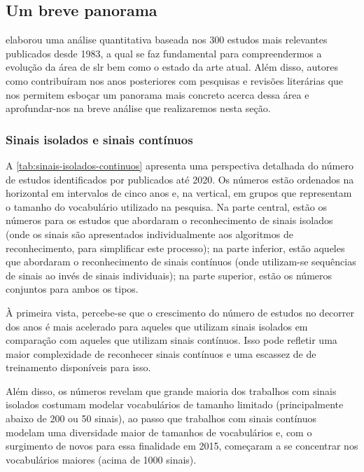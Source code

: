 \subsection{Um breve panorama}
\label{sec:slr-breve-panorama}

 elaborou uma análise quantitativa baseada nos 300 estudos mais relevantes publicados desde 1983, a qual se faz fundamental para compreendermos a evolução da área de \acrshort{slr} bem como o estado da arte atual. Além disso, autores como  contribuíram nos anos posteriores com pesquisas e revisões literárias que nos permitem esboçar um panorama mais concreto acerca dessa área e aprofundar-nos na breve análise que realizaremos nesta seção.



\subsubsection{Sinais isolados e sinais contínuos}
\label{sec:slr-sinais-isolados-continuos}

A \autoref{tab:sinais-isolados-continuos} apresenta uma perspectiva detalhada do número de estudos identificados por  publicados até 2020. Os números estão ordenados na horizontal em intervalos de cinco anos e, na vertical, em grupos que representam o tamanho do vocabulário utilizado na pesquisa. Na parte central, estão os números para os estudos que abordaram o reconhecimento de sinais isolados (onde os sinais são apresentados individualmente aos algoritmos de reconhecimento, para simplificar este processo); na parte inferior, estão aqueles que abordaram o reconhecimento de sinais contínuos (onde utilizam-se sequências de sinais ao invés de sinais individuais); na parte superior, estão os números conjuntos para ambos os tipos.



À primeira vista, percebe-se que o crescimento do número de estudos no decorrer dos anos é mais acelerado para aqueles que utilizam sinais isolados em comparação com aqueles que utilizam sinais contínuos. Isso pode refletir uma maior complexidade de reconhecer sinais contínuos e uma escassez de \datasets de treinamento disponíveis para isso. 

Além disso, os números revelam que grande maioria dos trabalhos com sinais isolados costumam modelar vocabulários de tamanho limitado (principalmente abaixo de 200 ou 50 sinais), ao passo que trabalhos com sinais contínuos modelam uma diversidade maior de tamanhos de vocabulários e, com o surgimento de novos \datasets para essa finalidade em 2015, começaram a se concentrar nos vocabulários maiores (acima de 1000 sinais).




